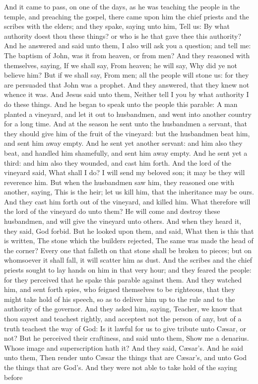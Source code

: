 And it came to pass, on one of the days, as he was teaching the people in the temple, and preaching the gospel, there came upon him the chief priests and the scribes with the elders; and they spake, saying unto him, Tell us: By what authority doest thou these things? or who is he that gave thee this authority? And he answered and said unto them, I also will ask you a question; and tell me: The baptism of John, was it from heaven, or from men? And they reasoned with themselves, saying, If we shall say, From heaven; he will say, Why did ye not believe him? But if we shall say, From men; all the people will stone us: for they are persuaded that John was a prophet. And they answered, that they knew not whence it was. And Jesus said unto them, Neither tell I you by what authority I do these things.  And he began to speak unto the people this parable: A man planted a vineyard, and let it out to husbandmen, and went into another country for a long time. And at the season he sent unto the husbandmen a servant, that they should give him of the fruit of the vineyard: but the husbandmen beat him, and sent him away empty. And he sent yet another servant: and him also they beat, and handled him shamefully, and sent him away empty. And he sent yet a third: and him also they wounded, and cast him forth. And the lord of the vineyard said, What shall I do? I will send my beloved son; it may be they will reverence him. But when the husbandmen saw him, they reasoned one with another, saying, This is the heir; let us kill him, that the inheritance may be ours. And they cast him forth out of the vineyard, and killed him. What therefore will the lord of the vineyard do unto them? He will come and destroy these husbandmen, and will give the vineyard unto others. And when they heard it, they said, God forbid. But he looked upon them, and said, What then is this that is written, The stone which the builders rejected, The same was made the head of the corner?  Every one that falleth on that stone shall be broken to pieces; but on whomsoever it shall fall, it will scatter him as dust.  And the scribes and the chief priests sought to lay hands on him in that very hour; and they feared the people: for they perceived that he spake this parable against them. And they watched him, and sent forth spies, who feigned themselves to be righteous, that they might take hold of his speech, so as to deliver him up to the rule and to the authority of the governor. And they asked him, saying, Teacher, we know that thou sayest and teachest rightly, and acceptest not the person of any, but of a truth teachest the way of God: Is it lawful for us to give tribute unto Cæsar, or not? But he perceived their craftiness, and said unto them, Show me a denarius. Whose image and superscription hath it? And they said, Cæsar’s. And he said unto them, Then render unto Cæsar the things that are Cæsar’s, and unto God the things that are God’s. And they were not able to take hold of the saying before 